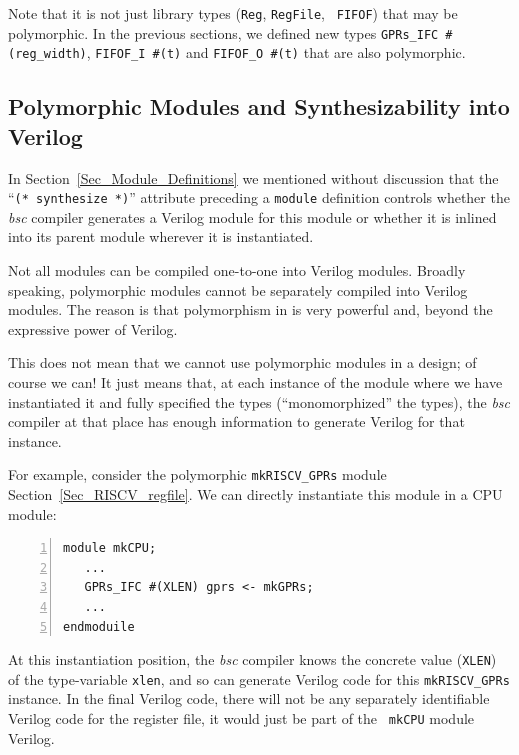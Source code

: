 Note that it is not just library types ({\tt Reg}, {\tt RegFile}, {\tt
FIFOF}) that may be polymorphic.  In the previous sections, we defined
new types \verb|GPRs_IFC #(reg_width)|, \verb|FIFOF_I #(t)| and
\verb|FIFOF_O #(t)| that are also polymorphic.




\subsection{Polymorphic Modules and Synthesizability into Verilog}

\label{Sec_Polymorphic_Types_and_Synthesizability}


In Section~\ref{Sec_Module_Definitions} we mentioned without
discussion that the ``{\tt (* synthesize *)}'' attribute preceding a
{\tt module} definition controls whether the \emph{bsc} compiler
generates a Verilog module for this {\BSV} module or whether it is
inlined into its parent module wherever it is instantiated.

Not all {\BSV} modules can be compiled one-to-one into Verilog modules.
Broadly speaking, polymorphic modules cannot be separately compiled
into Verilog modules.  The reason is that polymorphism in {\BSV} is very
powerful and, beyond the expressive power of Verilog.

This does not mean that we cannot use polymorphic modules in a {\BSV}
design; of course we can!  It just means that, at each instance of the
module where we have instantiated it and fully specified the types
(``monomorphized'' the types), the \emph{bsc} compiler at that place
has enough information to generate Verilog for that instance.

For example, consider the polymorphic {\tt mkRISCV\_GPRs} module
Section~\ref{Sec_RISCV_regfile}.  We can directly instantiate this
module in a CPU module:

{\footnotesize
\begin{Verbatim}[frame=single, numbers=left]
module mkCPU;
   ...
   GPRs_IFC #(XLEN) gprs <- mkGPRs;
   ...
endmoduile
\end{Verbatim}
}

At this instantiation position, the \emph{bsc} compiler knows the
concrete value ({\tt XLEN}) of the type-variable {\tt xlen}, and so
can generate Verilog code for this {\tt mkRISCV\_GPRs} instance.  In
the final Verilog code, there will not be any separately identifiable
Verilog code for the register file, it would just be part of the {\tt
mkCPU} module Verilog.

